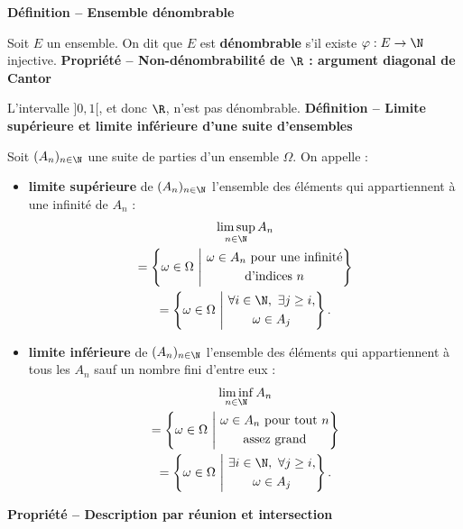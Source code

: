 \textbf{Définition – Ensemble dénombrable}

Soit $E$ un ensemble. On dit que $E$ est \textbf{dénombrable} s’il existe $\varphi:E\to\N$ injective.
\textbf{Propriété – Non-dénombrabilité de $\R$ : argument diagonal de Cantor}

L’intervalle $]0,1[$, et donc $\R$, n’est pas dénombrable.
\textbf{Définition – Limite supérieure et limite inférieure d’une suite d’ensembles}

Soit $(A_n)_{n\in\N}$ une suite de parties d’un ensemble $\Omega$. On appelle :
\begin{itemize}
\item \textbf{limite supérieure} de $(A_n)_{n\in\N}$ l’ensemble des éléments qui appartiennent à une infinité de $A_n$ :
\[
\begin{gathered}
\limsup_{n\in\N} A_n\\
=\left\{\omega\in\Omega\ \middle|\ \begin{gathered}\omega\in A_n\text{ pour une infinité}\\\text{d’indices }n\end{gathered}\right\}\\
=\left\{\omega\in\Omega\ \middle|\ \begin{gathered}\forall i\in\N,\ \exists j\ge i,\\\omega\in A_j\end{gathered}\right\}.
\end{gathered}
\]
\item \textbf{limite inférieure} de $(A_n)_{n\in\N}$ l’ensemble des éléments qui appartiennent à tous les $A_n$ sauf un nombre fini d’entre eux :
\[
\begin{gathered}
\liminf_{n\in\N} A_n\\
=\left\{\omega\in\Omega\ \middle|\ \begin{gathered}\omega\in A_n\text{ pour tout }n\\\text{assez grand}\end{gathered}\right\}\\
=\left\{\omega\in\Omega\ \middle|\ \begin{gathered}\exists i\in\N,\ \forall j\ge i,\\\omega\in A_j\end{gathered}\right\}.
\end{gathered}
\]
\end{itemize}
\textbf{Propriété – Description par réunion et intersection}


